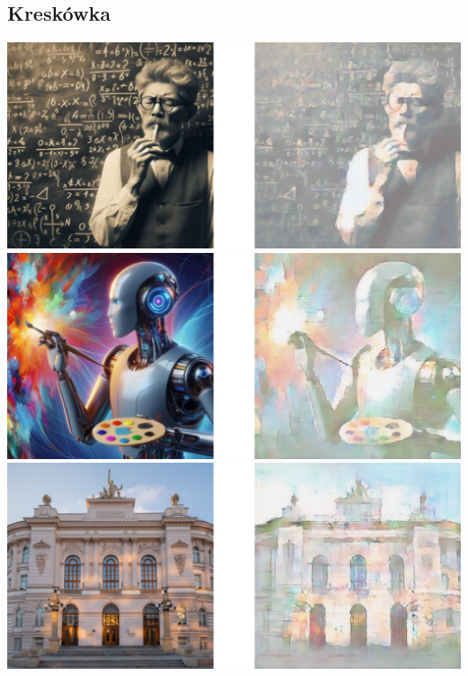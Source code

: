 \documentclass{article}
\begin{document}
\subsection{Kreskówka}
\includegraphics[width=\textwidth]{../imgs/side_by_side/c1.png}
\vspace{3mm} \\
\includegraphics[width=\textwidth]{../imgs/side_by_side/c2.png}
\vspace{3mm} \\
\includegraphics[width=\textwidth]{../imgs/side_by_side/c3.png}
\end{document}
